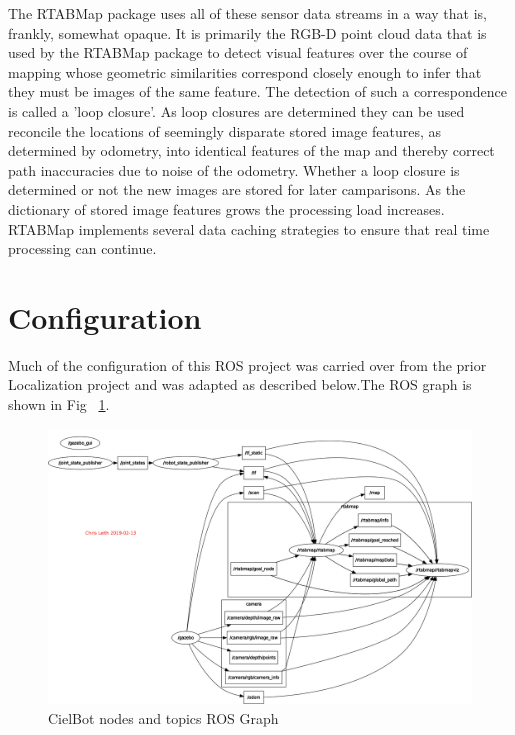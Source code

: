 \documentclass[10pt,journal,compsoc]{IEEEtran}
\begin{document}
The RTABMap package uses all of these sensor data streams in a way that is, frankly, somewhat opaque. It is primarily the RGB-D point cloud data that is used by the RTABMap package to detect visual features over the course of mapping whose geometric similarities correspond closely enough to infer that they must be images of the same feature. The detection of such a correspondence is called a 'loop closure'. As loop closures are determined they can be used reconcile the locations of seemingly disparate stored image features, as determined by odometry, into identical features of the map and thereby correct path inaccuracies due to noise of the odometry. Whether a loop closure is determined or not the new images are stored for later camparisons. As the dictionary of stored image features grows the processing load increases. RTABMap implements several data caching strategies to ensure that real time processing can continue.


\section{Configuration}
Much of the configuration of this ROS project was carried over from the prior Localization project and was adapted as described below.The ROS graph is shown in Fig ~\ref{fig:rosgraph}.

\begin{figure}[h]
      \centering
      \includegraphics[width=\linewidth]{Assets/rosgraph_working.png}
      \caption{CielBot nodes and topics ROS Graph}
      \label{fig:rosgraph}
\end{figure}
\end{document}
